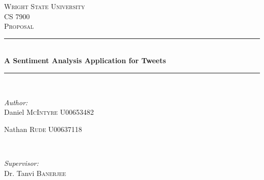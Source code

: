\begin{titlepage}

\newcommand{\HRule}{\rule{\linewidth}{0.5mm}} %

\center %
 

\textsc{\LARGE Wright State University}\\[1.5cm] %
\textsc{\Large CS 7900}\\[0.5cm] %
\textsc{\large Proposal}\\[0.5cm] %


\HRule \\[0.4cm]
{ \huge \bfseries A Sentiment Analysis Application for Tweets}\\[0.4cm] %
\HRule \\[1.5cm]
 

\begin{minipage}{0.4\textwidth}
\begin{flushleft} \large
\emph{Author:}\\
Daniel \textsc{McIntyre} U00653482 %

Nathan \textsc{Rude} U00637118%

\end{flushleft}
\end{minipage}
~
\begin{minipage}{0.4\textwidth}
\begin{flushright} \large
\emph{Supervisor:} \\
Dr. Tanvi \textsc{Banerjee} %
\end{flushright}
\end{minipage}\\[4cm]


\end{titlepage}
